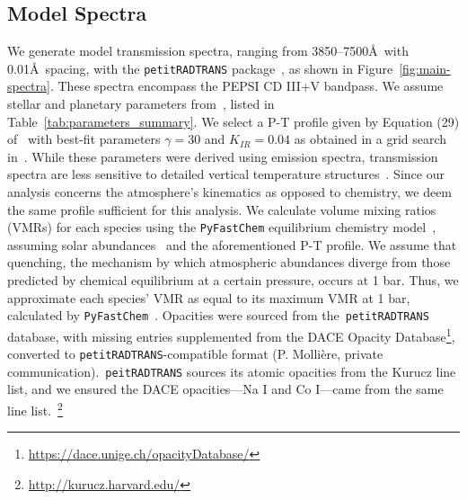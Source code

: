 \documentclass[twocolumn]{aastex631}
\newcommand{\code}[1]{\texttt{#1}}
\begin{document}
        \subsection{Model Spectra}\label{subsec:Model Spectra}
            We generate model transmission spectra, ranging from 3850--7500\AA\ with 0.01\AA\ spacing, with the \code{petitRADTRANS} package~\citep{petitRADTRANS}, as shown in Figure~\ref{fig:main-spectra}. These spectra encompass the PEPSI CD III+V bandpass. We assume stellar and planetary parameters from~\citet{Lund2017}, listed in Table~\ref{tab:parameters_summary}. We select a P-T profile given by Equation (29) of~\citet{Guillot2010} with best-fit parameters $\gamma = 30$ and $K_{IR} = 0.04$ as obtained in a grid search in~\citet{Johnson2023}. While these parameters were derived using emission spectra, transmission spectra are less sensitive to detailed vertical temperature structures~\citep{Kesseli2020}. Since our analysis concerns the atmosphere's kinematics as opposed to chemistry, we deem the same profile sufficient for this analysis. 
            We calculate volume mixing ratios (VMRs) for each species using the \code{PyFastChem} equilibrium chemistry model~\citep{Stock2018, Stock2022, Kitzmann2023}, assuming solar abundances~\citep{Asplund2021} and the aforementioned P-T profile. We assume that quenching, the mechanism by which atmospheric abundances diverge from those predicted by chemical equilibrium at a certain pressure, occurs at 1 bar. Thus, we approximate each species' VMR as equal to its maximum VMR at 1 bar, calculated by \code{PyFastChem}~\citep{Johnson2023,Petz2023}. Opacities were sourced from the~\code{petitRADTRANS} database, with missing entries supplemented from the DACE Opacity Database\footnote{\url{https://dace.unige.ch/opacityDatabase/}}, converted to \code{petitRADTRANS}-compatible format (P. Mollière, private communication).~\code{peitRADTRANS} sources its atomic opacities from the Kurucz line list, and we ensured the DACE opacities---Na I and Co I---came from the same line list.~\footnote{\url{http://kurucz.harvard.edu/}}
        
\end{document}
